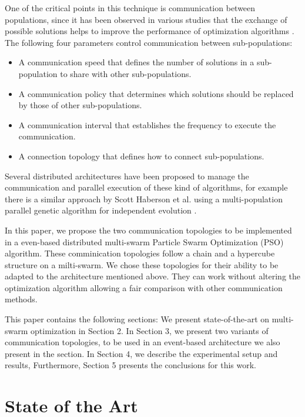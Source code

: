 \documentclass[runningheads]{llncs}
\begin{document}
One of the critical points in this technique is communication between
populations, since it has been observed in various studies that the
exchange of possible solutions helps to improve the performance of
optimization algorithms \cite{a2}. The following four parameters
control communication between sub-populations:

\begin{itemize}
    \item A communication speed that defines the number of solutions in a sub-population to share with other sub-populations.
    \item A communication policy that determines which solutions should be replaced by those of other sub-populations.
    \item A communication interval that establishes the frequency to execute the communication.
    \item A connection topology that defines how to connect sub-populations.
\end{itemize}

Several distributed architectures have been proposed to manage the communication
and parallel execution of these kind of algorithms, for example there is a
similar approach by Scott Haberson et al. using a multi-population parallel
genetic algorithm for independent evolution \cite{da1}. 

In this paper, we propose the two communication topologies to be implemented in a 
even-based distributed multi-swarm Particle Swarm Optimization (PSO) algorithm.
These comminication topologies follow a chain and a hypercube structure on a milti-swarm. We chose
these topologies for their ability to be adapted to the architecture
mentioned above. They can work without altering the optimization
algorithm allowing a fair comparison with other communication
methods. 

This paper contains the following sections: We present state-of-the-art on
multi-swarm optimization in Section 2. In Section 3, we present two variants of communication topologies,
to be used in an event-based architecture we also present in the section. In Section 4, 
we describe the experimental setup and results, Furthermore,
Section 5 presents the conclusions for this work.

\section{State of the Art}
\end{document}
